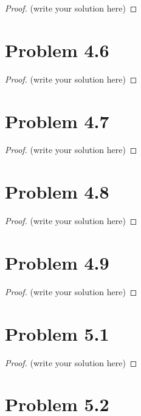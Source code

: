\documentclass[12pt]{article}
\begin{document}
\begin{proof}
	(write your solution here)
\end{proof}

\newpage 

\section{Problem 4.6}

\begin{proof}
	(write your solution here)
\end{proof}

\newpage 

\section{Problem 4.7}

\begin{proof}
	(write your solution here)
\end{proof}

\newpage 

\section{Problem 4.8}

\begin{proof}
	(write your solution here)
\end{proof}

\newpage

\section{Problem 4.9}

\begin{proof}
	(write your solution here)
\end{proof}

\newpage 

\section{Problem 5.1}

\begin{proof}
	(write your solution here)
\end{proof}

\newpage 

\section{Problem 5.2}
\end{document}
